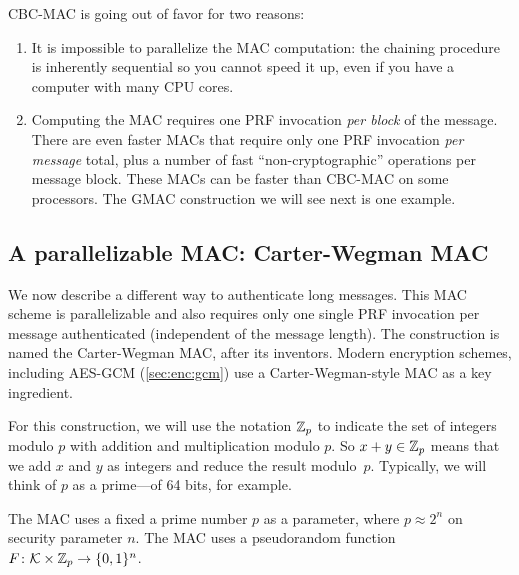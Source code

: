CBC-MAC is going out of favor for two reasons:
\begin{enumerate}
  \item It is impossible to parallelize the MAC computation:
        the chaining procedure is inherently sequential so you 
        cannot speed it up, even if you have a computer with many 
        CPU cores.
  \item Computing the MAC requires one PRF invocation \emph{per block} of the message.
        There are even faster MACs that require only one PRF invocation
        \emph{per message} total, 
        plus a number of fast ``non-cryptographic'' operations
        per message block.
        These MACs can be faster than CBC-MAC on some processors.
        The GMAC construction we will see next is one example.
\end{enumerate}


\subsection{A parallelizable MAC: Carter-Wegman MAC}

We now describe a different way to authenticate long messages.
This MAC scheme is parallelizable and also requires only one 
single PRF invocation per message authenticated (independent of
the message length).
The construction is named the Carter-Wegman MAC, after its
inventors.\cite{CW81}
Modern encryption schemes, including AES-GCM (\cref{sec:enc:gcm})
use a Carter-Wegman-style MAC as a key ingredient.

For this construction, we will use the notation
$\mathbb{Z}_p$ to indicate the set of integers modulo $p$
with addition and multiplication modulo $p$.
So $x + y \in \mathbb{Z}_p$ means that we add $x$ and $y$
as integers and reduce the result modulo~$p$.
Typically, we will think of $p$ as a prime---of
64 bits, for example.

The MAC uses a fixed a prime number $p$ as a parameter,
where $p \approx 2^n$ on security parameter $n$.
The MAC uses a pseudorandom function 
$F \colon \mathcal{K} \times \mathbb{Z}_p \to \{0,1\}^n$.


